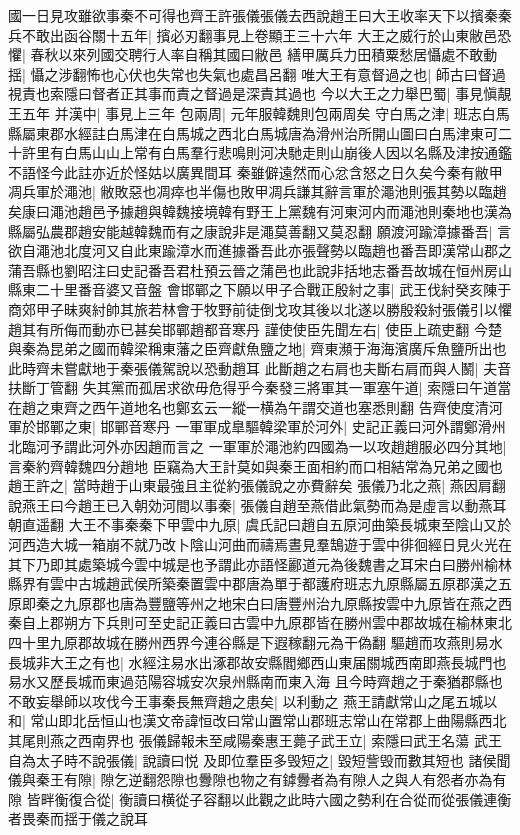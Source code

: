 國一日見攻雖欲事秦不可得也齊王許張儀張儀去西說趙王曰大王收率天下以擯秦秦兵不敢出函谷關十五年|{
	擯必刃翻事見上卷顯王三十六年}
大王之威行於山東敝邑恐懼|{
	春秋以來列國交聘行人率自稱其國曰敝邑}
繕甲厲兵力田積粟愁居懾處不敢動揺|{
	懾之涉翻怖也心伏也失常也失氣也處昌呂翻}
唯大王有意督過之也|{
	師古曰督過視責也索隱曰督者正其事而責之督過是深責其過也}
今以大王之力舉巴蜀|{
	事見愼靚王五年}
并漢中|{
	事見上三年}
包兩周|{
	元年服韓魏則包兩周矣}
守白馬之津|{
	班志白馬縣屬東郡水經註白馬津在白馬城之西北白馬城唐為滑州治所開山圖曰白馬津東可二十許里有白馬山山上常有白馬羣行悲鳴則河决馳走則山崩後人因以名縣及津按通鑑不語怪今此註亦近於怪姑以廣異間耳}
秦雖僻遠然而心忿含怒之日久矣今秦有敝甲凋兵軍於澠池|{
	敝敗惡也凋瘁也半傷也敗甲凋兵謙其辭言軍於澠池則張其勢以臨趙矣康曰澠池趙邑予據趙與韓魏接境韓有野王上黨魏有河東河内而澠池則秦地也漢為縣屬弘農郡趙安能越韓魏而有之康說非是澠莫善翻又莫忍翻}
願渡河踰漳據番吾|{
	言欲自澠池北度河又自此東踰漳水而進據番吾此亦張聲勢以臨趙也番吾即漢常山郡之蒲吾縣也劉昭注曰史記番吾君杜預云晉之蒲邑也此說非括地志番吾故城在恒州房山縣東二十里番音婆又音盤}
會邯鄲之下願以甲子合戰正殷紂之事|{
	武王伐紂癸亥陳于商郊甲子昧爽紂帥其旅若林會于牧野前徒倒戈攻其後以北遂以勝殷殺紂張儀引以懼趙其有所侮而動亦已甚矣邯鄲趙都音寒丹}
謹使使臣先聞左右|{
	使臣上疏吏翻}
今楚與秦為昆弟之國而韓梁稱東藩之臣齊獻魚鹽之地|{
	齊東瀕于海海濱廣斥魚鹽所出也此時齊未嘗獻地于秦張儀駕說以恐動趙耳}
此斷趙之右肩也夫斷右肩而與人鬭|{
	夫音扶斷丁管翻}
失其黨而孤居求欲毋危得乎今秦發三將軍其一軍塞午道|{
	索隱曰午道當在趙之東齊之西午道地名也鄭玄云一縱一横為午謂交道也塞悉則翻}
告齊使度清河軍於邯鄲之東|{
	邯鄲音寒丹}
一軍軍成臯驅韓梁軍於河外|{
	史記正義曰河外謂鄭滑州北臨河予謂此河外亦因趙而言之}
一軍軍於澠池約四國為一以攻趙趙服必四分其地|{
	言秦約齊韓魏四分趙地}
臣竊為大王計莫如與秦王面相約而口相結常為兄弟之國也趙王許之|{
	當時趙于山東最強且主從約張儀說之亦費辭矣}
張儀乃北之燕|{
	燕因肩翻}
說燕王曰今趙王已入朝効河間以事秦|{
	張儀自趙至燕借此氣勢而為是虛言以動燕耳朝直遥翻}
大王不事秦秦下甲雲中九原|{
	虞氏記曰趙自五原河曲築長城東至陰山又於河西造大城一箱崩不就乃改卜陰山河曲而禱焉晝見羣鵠遊于雲中徘徊經日見火光在其下乃即其處築城今雲中城是也予謂此亦語怪酈道元為後魏書之耳宋白曰勝州榆林縣界有雲中古城趙武侯所築秦置雲中郡唐為單于都護府班志九原縣屬五原郡漢之五原即秦之九原郡也唐為豐鹽等州之地宋白曰唐豐州治九原縣按雲中九原皆在燕之西秦自上郡朔方下兵則可至史記正義曰古雲中九原郡皆在勝州雲中郡故城在榆林東北四十里九原郡故城在勝州西界今連谷縣是下遐稼翻元為干偽翻}
驅趙而攻燕則易水長城非大王之有也|{
	水經注易水出涿郡故安縣閻鄉西山東届關城西南即燕長城門也易水又歷長城而東過范陽容城安次泉州縣南而東入海}
且今時齊趙之于秦猶郡縣也不敢妄舉師以攻伐今王事秦長無齊趙之患矣|{
	以利動之}
燕王請獻常山之尾五城以和|{
	常山即北岳恒山也漢文帝諱恒改曰常山置常山郡班志常山在常郡上曲陽縣西北其尾則燕之西南界也}
張儀歸報未至咸陽秦惠王薨子武王立|{
	索隱曰武王名蕩}
武王自為太子時不說張儀|{
	說讀曰悦}
及即位羣臣多毁短之|{
	毀短訾毁而數其短也}
諸侯聞儀與秦王有隙|{
	隙乞逆翻怨隙也釁隙也物之有鏬釁者為有隙人之與人有怨者亦為有隙}
皆畔衡復合從|{
	衡讀曰横從子容翻以此觀之此時六國之勢利在合從而從張儀連衡者畏秦而揺于儀之說耳}


